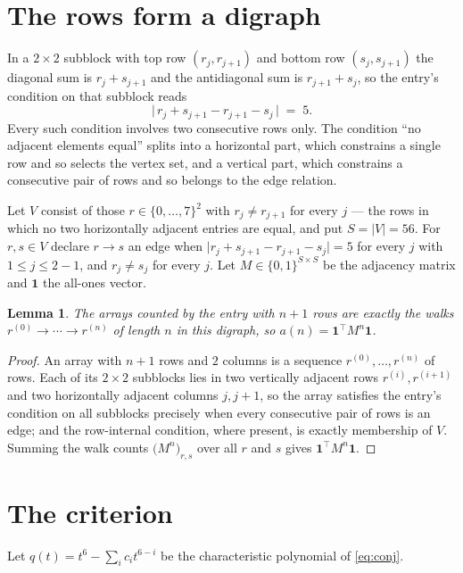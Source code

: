 \documentclass[11pt,a4paper]{article}
\theoremstyle{plain}
\newtheorem{lemma}[theorem]{Lemma}
\theoremstyle{definition}
\begin{document}
\section{The rows form a digraph}

In a $2\times2$ subblock with top row $(r_j,r_{j+1})$ and bottom row $(s_j,s_{j+1})$ the
diagonal sum is $r_j+s_{j+1}$ and the antidiagonal sum is $r_{j+1}+s_j$, so the entry's
condition on that subblock reads
\[
\bigl|\,r_j+s_{j+1}-r_{j+1}-s_j\,\bigr|\;=\;5.
\]
Every such condition involves two consecutive rows only. The condition ``no adjacent elements equal'' splits into a horizontal
part, which constrains a single row and so selects the vertex set, and a vertical part,
which constrains a consecutive pair of rows and so belongs to the edge relation.

Let $V$ consist of those $r\in\{0,\dots,7\}^{2}$ with $r_j\ne r_{j+1}$ for every
$j$ --- the rows in which no two horizontally adjacent entries are equal, and put $S=|V|=56$. For $r,s\in V$ declare $r\to s$ an edge
when $\bigl|r_j+s_{j+1}-r_{j+1}-s_j\bigr|=5$ for every $j$ with
$1\le j\le2-1$, and $r_j\ne s_j$ for every $j$. Let $M\in\{0,1\}^{S\times S}$ be the adjacency matrix and $\mathbf{1}$
the all-ones vector.

\begin{lemma}\label{lem:walk}
The arrays counted by the entry with $n+1$ rows are exactly the walks
$r^{(0)}\to\cdots\to r^{(n)}$ of length $n$ in this digraph, so
$a(n)=\mathbf{1}^{\!\top}M^{n}\mathbf{1}$.
\end{lemma}

\begin{proof}
An array with $n+1$ rows and $2$ columns is a sequence $r^{(0)},\dots,r^{(n)}$ of
rows. Each of its $2\times2$ subblocks lies in two vertically adjacent rows
$r^{(i)},r^{(i+1)}$ and two horizontally adjacent columns $j,j+1$, so the array satisfies
the entry's condition on all subblocks precisely when every consecutive pair of rows is an
edge; and the row-internal condition, where present, is exactly membership of $V$. Summing
the walk counts $\bigl(M^{n}\bigr)_{r,s}$ over all $r$ and $s$ gives
$\mathbf{1}^{\!\top}M^{n}\mathbf{1}$.
\end{proof}

\section{The criterion}

Let $q(t)=t^{6}-\sum_i c_i t^{6-i}$ be the characteristic polynomial of
\eqref{eq:conj}.
\end{document}

